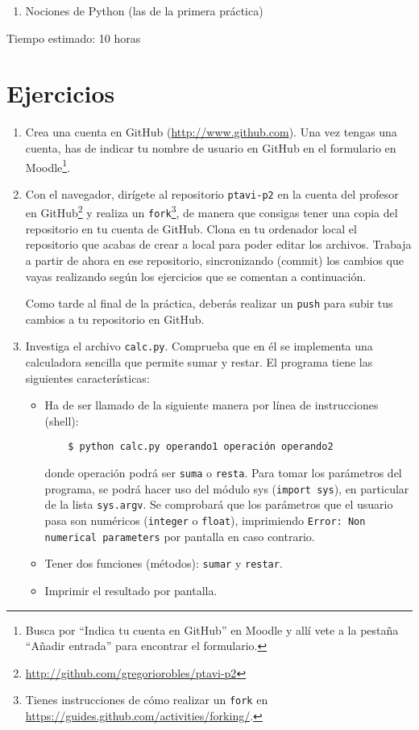 \documentclass[11pt,a4paper]{article}
\begin{document}
\begin{enumerate}
  \item Nociones de Python (las de la primera práctica)
\end{enumerate}

Tiempo estimado: 10 horas

\section{Ejercicios}

\begin{enumerate}

  \item Crea una cuenta en GitHub (\url{http://www.github.com}). Una vez tengas una cuenta, has de indicar tu nombre de usuario en GitHub en el formulario en Moodle\footnote{Busca por ``Indica tu cuenta en GitHub'' en Moodle y allí vete a la pestaña ``Añadir entrada'' para encontrar el formulario.}.
  
    \item Con el navegador, dirígete al repositorio \texttt{ptavi-p2} en la cuenta del profesor en GitHub\footnote{\url{http://github.com/gregoriorobles/ptavi-p2}} y realiza un \texttt{fork}\footnote{Tienes instrucciones de cómo realizar un \texttt{fork} en \url{https://guides.github.com/activities/forking/}.}, de manera que consigas tener una copia del repositorio en tu cuenta de GitHub. Clona en tu ordenador local el repositorio que acabas de crear a local para poder editar los archivos. Trabaja a partir de ahora en ese repositorio, sincronizando (commit) los cambios que vayas realizando según los ejercicios que se comentan a continuación.

  Como tarde al final de la práctica, deberás realizar un \texttt{push} para subir tus cambios a tu repositorio en GitHub.

  \item Investiga el archivo \texttt{calc.py}. Comprueba que en él se implementa una calculadora sencilla que permite sumar y restar. El programa tiene las siguientes características:
  \begin{itemize}
    \item Ha de ser llamado de la siguiente manera por línea de instrucciones (shell):
    \begin{verbatim}
    $ python calc.py operando1 operación operando2
    \end{verbatim}
donde operación podrá ser \texttt{suma} o \texttt{resta}. Para tomar los parámetros del programa, se podrá hacer uso del módulo sys (\texttt{import sys}), en particular de la lista \texttt{sys.argv}. Se comprobará que los parámetros que el usuario pasa son numéricos (\texttt{integer} o \texttt{float}), imprimiendo \texttt{Error: Non numerical parameters} por pantalla en caso contrario.
    \item Tener dos funciones (métodos): \texttt{sumar} y \texttt{restar}.
    \item Imprimir el resultado por pantalla.
  \end{itemize}



\end{enumerate}
\end{document}
